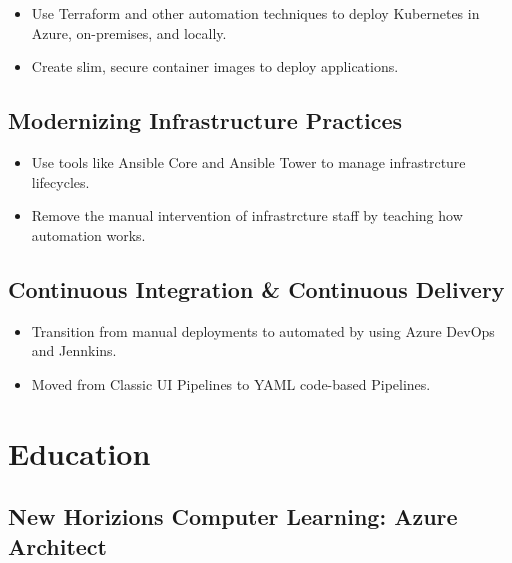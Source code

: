 \documentclass{article}
\begin{document}
      \begin{scriptsize}
        \begin{itemize}
          \item Use Terraform and other automation techniques to deploy Kubernetes in Azure, on-premises, and locally.
          \item Create slim, secure container images to deploy applications.
        \end{itemize}
      \end{scriptsize}

    \subsection{Modernizing Infrastructure Practices}

      \begin{scriptsize}
        \begin{itemize}
          \item Use tools like Ansible Core and Ansible Tower to manage infrastrcture lifecycles.
          \item Remove the manual intervention of infrastrcture staff by teaching how automation works.
        \end{itemize}
      \end{scriptsize}

    \subsection{Continuous Integration \& Continuous Delivery}
    
      \begin{scriptsize}
        \begin{itemize}
          \item Transition from manual deployments to automated by using Azure DevOps and Jennkins.
          \item Moved from Classic UI Pipelines to YAML code-based Pipelines.
        \end{itemize}
      \end{scriptsize}

  \section{Education}
    \subsection{New Horizions Computer Learning: Azure Architect}
\end{document}
